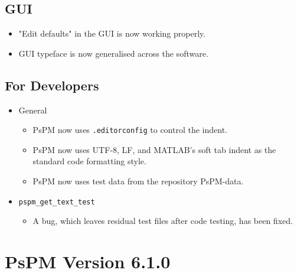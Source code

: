\documentclass[english]{article}
\numberwithin{equation}{section}
\numberwithin{figure}{section}
\begin{document}
\subsection*{GUI}
\begin{itemize}
\item "Edit defaults" in the GUI is now working properly.
\item GUI typeface is now generalised across the software.
\end{itemize}

\subsection*{For Developers}
\begin{itemize}
\item General
  \begin{itemize}
  \item PsPM now uses \texttt{.editorconfig} to control the indent.
  \item PsPM now uses UTF-8, LF, and MATLAB's soft tab indent as the standard code formatting style.
  \item PsPM now uses test data from the repository PsPM-data.
  \end{itemize}
\item \texttt{pspm\_get\_text\_test}
  \begin{itemize}
  \item A bug, which leaves residual test files after code testing, has been fixed.
  \end{itemize}
\end{itemize}

\section{PsPM Version 6.1.0}
\end{document}
